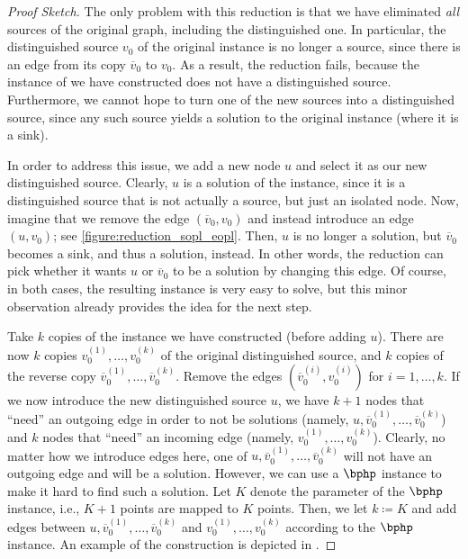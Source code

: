 \documentclass[10pt,a4paper]{article}
\theoremstyle{definition}
\theoremstyle{plain}
\theoremstyle{remark}
\begin{document}
\begin{proof}[Proof Sketch]
The only problem with this reduction is that we have eliminated \emph{all} sources of the original graph, including the distinguished one. In particular, the distinguished source $v_0$ of the original instance is no longer a source, since there is an edge from its copy $\overline{v}_0$ to $v_0$. As a result, the reduction fails, because the instance of \eopl we have constructed does not have a distinguished source. Furthermore, we cannot hope to turn one of the new sources into a distinguished source, since any such source yields a solution to the original instance (where it is a sink).

In order to address this issue, we add a new node $u$ and select it as our new distinguished source. Clearly, $u$ is a solution of the instance, since it is a distinguished source that is not actually a source, but just an isolated node. Now, imagine that we remove the edge $(\overline{v}_0,v_0)$ and instead introduce an edge $(u,v_0)$; see \cref{figure:reduction_sopl_eopl}. Then, $u$ is no longer a solution, but $\overline{v}_0$ becomes a sink, and thus a solution, instead. In other words, the reduction can pick whether it wants $u$ or $\overline{v}_0$ to be a solution by changing this edge. Of course, in both cases, the resulting instance is very easy to solve, but this minor observation already provides the idea for the next step.

Take $k$ copies of the instance we have constructed (before adding $u$). There are now $k$ copies $v_0^{(1)}, \dots, v_0^{(k)}$ of the original distinguished source, and $k$ copies of the reverse copy $\overline{v}_0^{(1)}, \dots, \overline{v}_0^{(k)}$. Remove the edges $(\overline{v}_0^{(i)}, v_0^{(i)})$ for $i = 1, \dots, k$. If we now introduce the new distinguished source $u$, we have $k+1$ nodes that ``need'' an outgoing edge in order to not be solutions (namely, $u, \overline{v}_0^{(1)}, \dots, \overline{v}_0^{(k)}$) and $k$ nodes that ``need'' an incoming edge (namely, $v_0^{(1)}, \dots, v_0^{(k)}$). Clearly, no matter how we introduce edges here, one of $u, \overline{v}_0^{(1)}, \dots, \overline{v}_0^{(k)}$ will not have an outgoing edge and will be a solution. However, we can use a $\bphp$ instance to make it hard to find such a solution. Let $K$ denote the parameter of the $\bphp$ instance, i.e., $K+1$ points are mapped to $K$ points. Then, we let $k \coloneqq K$ and add edges between $u, \overline{v}_0^{(1)}, \dots, \overline{v}_0^{(k)}$ and $v_0^{(1)}, \dots, v_0^{(k)}$ according to the $\bphp$ instance. An example of the construction is depicted in .




\end{proof}
\end{document}
